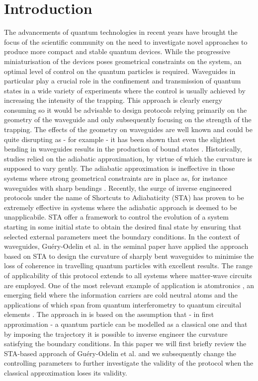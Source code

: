 \section{Introduction}
The advancements of quantum technologies in  recent years have brought the focus of the scientific community on the need to investigate novel approaches to produce more compact and stable quantum devices.
While the progressive miniaturisation of the devices poses geometrical constraints on the system, an optimal level of control on the quantum particles is required.
Waveguides in particular play a crucial role in the confinement and transmission of quantum states in a wide variety of experiments where the control is usually achieved by increasing the intensity of the trapping.
This approach is clearly energy consuming so it would be advisable to design protocols relying primarily on the geometry of the waveguide and only subsequently focusing on the strength of the trapping.
The effects of the geometry on waveguides are well known and could be quite disrupting as - for example - it has been shown that even the slightest bending in waveguides results in the production of bound states \cite{BoundStatesInGoldst1992}.
Historically, studies relied on the adiabatic approximation, by virtue of which the curvature is supposed to vary gently.
The adiabatic approximation is ineffective in those systems where strong geometrical constraints are in place as, for instance waveguides with sharp bendings \cite{BoundStatesInClark1996, BoundStatesInBittne2013, MultipleBoundCarini1993}.
Recently, the surge of inverse engineered protocols under the name of Shortcuts to Adiabaticity  \cite{ShortcutsToAdGuery2019} (STA) has proven to be extremely effective in systems where the adiabatic approach is deemed to be unapplicabile.
STA offer a framework to control the evolution of a system starting in some initial state to obtain the desired final state by ensuring that selected external parameters meet the boundary conditions.
In the context of waveguides, Gu\'ery-Odelin et al. in the seminal paper \cite{QuantumControlImpens2020} have applied the approach based on STA to design the curvature of sharply bent waveguides to minimise the loss of coherence in travelling quantum particles with excellent results.
The range of applicability of this protocol extends to all systems where matter-wave circuits are employed.
One of the most relevant example of application is atomtronics \cite{RoadmapOnAtomAmico2021}, an emerging field where the information carriers are cold neutral atoms and the applications of which span from quantum interferometry \cite{MagneticallyGuQiLu2017, 80kmomentumSeMcdona2013} to quantum circuital elements \cite{FocusOnAtomtrAmico2017, AdvancesInAtoPepino2021}.
The approach in \cite{QuantumControlImpens2020} is based on the assumption that - in first approximation - a quantum particle can be modelled as a classical one and that by imposing the trajectory it is possible to inverse engineer the curvature satisfying the boundary conditions.
In this paper we will first briefly review the STA-based approach of Gu\'ery-Odelin et al. and we subsequently change the controlling parameters to further investigate the validity of the protocol when the classical approximation loses its validity.

